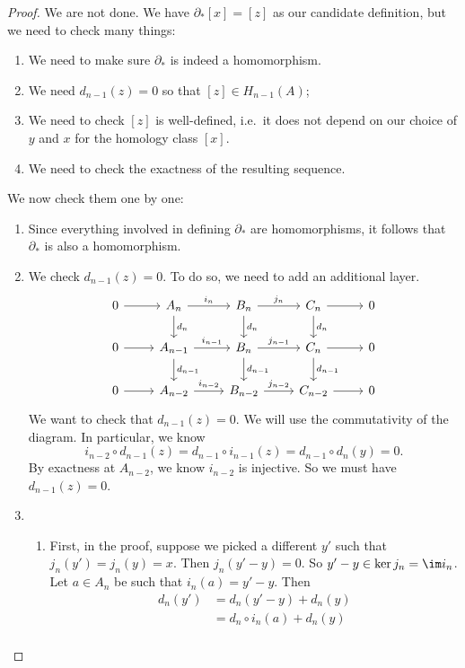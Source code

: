 \documentclass[a4paper]{article}
\begin{document}
\begin{proof}
  We are not done. We have $\partial_* [x] = [z]$ as our candidate definition, but we need to check many things:
  \begin{enumerate}
    \item We need to make sure $\partial_*$ is indeed a homomorphism.
    \item We need $d_{n - 1}(z) = 0$ so that $[z] \in H_{n - 1}(A)$;
    \item We need to check $[z]$ is well-defined, i.e.\ it does not depend on our choice of $y$ and $x$ for the homology class $[x]$.
    \item We need to check the exactness of the resulting sequence.
  \end{enumerate}
  We now check them one by one:
  \begin{enumerate}
    \item Since everything involved in defining $\partial_*$ are homomorphisms, it follows that $\partial_*$ is also a homomorphism.
    \item We check $d_{n - 1}(z) = 0$. To do so, we need to add an additional layer.
      \[
        \begin{tikzcd}
          0 \ar[r] & A_n \ar[r, "i_n"] \ar[d, "d_n"] & B_n \ar[r, "j_n"] \ar[d, "d_n"] & C_n \ar[r] \ar[d, "d_n"] & 0\\
          0 \ar[r] & A_{n - 1} \ar[r, "i_{n - 1}"] \ar[d, "d_{n - 1}"] & B_n \ar[r, "j_{n - 1}"] \ar[d, "d_{n - 1}"] & C_n \ar[r] \ar[d, "d_{n - 1}"] & 0\\
          0 \ar[r] & A_{n - 2} \ar[r, "i_{n - 2}"] & B_{n - 2} \ar[r, "j_{n - 2}"] & C_{n - 2} \ar[r] & 0
        \end{tikzcd}
      \]
      We want to check that $d_{n - 1}(z) = 0$. We will use the commutativity of the diagram. In particular, we know
      \[
        i_{n - 2} \circ d_{n - 1}(z) = d_{n - 1} \circ i_{n - 1} (z) = d_{n - 1} \circ d_n(y) = 0.
      \]
      By exactness at $A_{n - 2}$, we know $i_{n - 2}$ is injective. So we must have $d_{n - 1}(z) = 0$.
    \item
      \begin{enumerate}
        \item First, in the proof, suppose we picked a different $y'$ such that $j_n(y') = j_n(y) = x$. Then $j_n(y' - y) = 0$. So $y' - y \in \ker j_n = \im i_n$. Let $a \in A_n$ be such that $i_n(a) = y' - y$. Then
          \begin{align*}
            d_n(y') &= d_n(y' - y) + d_n(y) \\
            &= d_n \circ i_n (a) + d_n(y) \\

\end{align*}
\end{enumerate}
\end{enumerate}
\end{proof}
\end{document}
